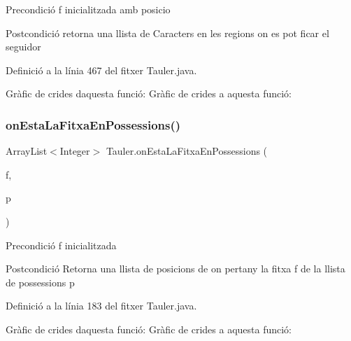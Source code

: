\begin{DoxyPrecond}{Precondició}
f inicialitzada amb posicio 
\end{DoxyPrecond}
\begin{DoxyPostcond}{Postcondició}
retorna una llista de Caracters en les regions on es pot ficar el seguidor 
\end{DoxyPostcond}


Definició a la línia 467 del fitxer Tauler.\+java.

Gràfic de crides d\textquotesingle{}aquesta funció\+:
Gràfic de crides a aquesta funció\+:
\mbox{\label{class_tauler_a6281d6d8601653fa74119e9eac3103a2}} 
\subsubsection{\texorpdfstring{on\+Esta\+La\+Fitxa\+En\+Possessions()}{onEstaLaFitxaEnPossessions()}}
{\footnotesize\ttfamily Array\+List$<$Integer$>$ Tauler.\+on\+Esta\+La\+Fitxa\+En\+Possessions (\begin{DoxyParamCaption}\item[{\mbox{\hyperlink{class_fitxa}{Fitxa}}}]{f,  }\item[{Array\+List$<$ \mbox{\hyperlink{class_possessio}{Possessio}} $>$}]{p }\end{DoxyParamCaption})\hspace{0.3cm}{\ttfamily [private]}}

\begin{DoxyPrecond}{Precondició}
f inicialitzada 
\end{DoxyPrecond}
\begin{DoxyPostcond}{Postcondició}
Retorna una llista de posicions de on pertany la fitxa f de la llista de possessions p 
\end{DoxyPostcond}


Definició a la línia 183 del fitxer Tauler.\+java.

Gràfic de crides d\textquotesingle{}aquesta funció\+:
Gràfic de crides a aquesta funció\+:
\mbox{\label{class_tauler_ac33b81e0bbd22c04fa99fdc47e72f79e}} 
